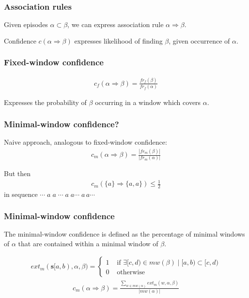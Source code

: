 \documentclass[dvipsnames]{beamer}
\begin{document}
\begin{frame}
\frametitle{Association rules}

Given episodes $ \alpha \subset \beta $, we can express association rule $ \alpha \Rightarrow \beta $.
\par\bigskip
Confidence $ c(\alpha \Rightarrow \beta) $ expresses likelihood of finding $ \beta $, given occurrence of $ \alpha $.

\end{frame}
\begin{frame}
\frametitle{Fixed-window confidence}

\begin{align*}
c_f(\alpha \Rightarrow \beta) = \frac{ fr_f(\beta) }{ fr_f(\alpha) }
\end{align*}

Expresses the probability of $ \beta $ occurring in a window which covers $ \alpha $.

\end{frame}
\begin{frame}
\frametitle{Minimal-window confidence?}

Naive approach, analogous to fixed-window confidence:
\begin{align*}
c_m(\alpha \Rightarrow \beta) = \frac{| fr_m(\beta) |}{| fr_m(\alpha) |}
\end{align*}
\pause
\par\bigskip
But then\begin{align*}c_m(\{ a \} \Rightarrow \{ a, a \}) \leq \frac12 \end{align*} in sequence $ \cdots\;a\;a\;\cdots\;a\;a\cdots\;a\,a\cdots $



\end{frame}
\begin{frame}
\frametitle{Minimal-window confidence}

The minimal-window confidence is defined as the percentage of minimal windows of $ \alpha $ that are contained within a minimal window of $ \beta $.

\begin{align*}
ext_m(\boldsymbol{s}[a, b), \alpha, \beta) =
\begin{cases}
    1 & \text{ if } \exists [c, d) \in mw(\beta) \mid [a, b) \subset [c, d) \\
    0 & \text{ otherwise}
\end{cases}
\end{align*}
\begin{align*}
c_m(\alpha \Rightarrow \beta) = \frac{\sum_{w \in mw(\alpha)} ext_m(w, \alpha, \beta)}{| mw(\alpha) |}
\end{align*}

\end{frame}
\end{document}
